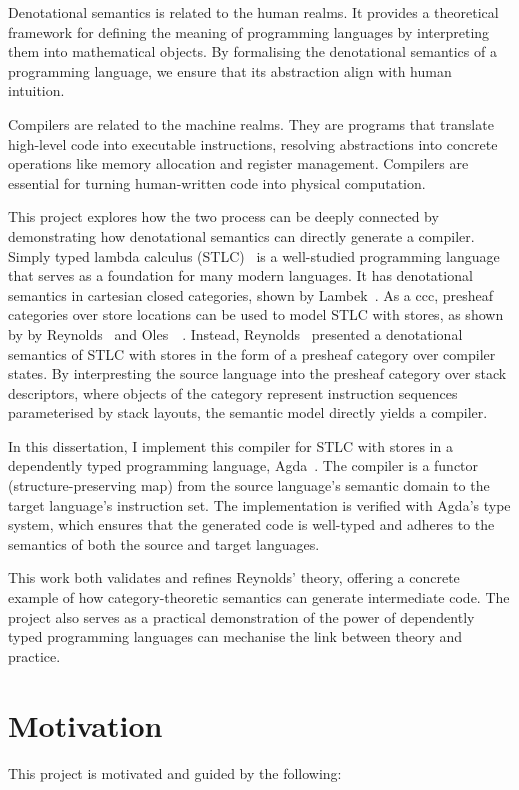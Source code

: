 \documentclass[12pt,twoside,a4paper]{report}
\theoremstyle{definition}
\theoremstyle{definition}
\theoremstyle{definition}
\theoremstyle{definition}
\newcounter{motivation}
\begin{document}
    Denotational semantics is related to the human realms. It provides a theoretical framework for defining the meaning of programming languages by interpreting them into mathematical objects. By formalising the denotational semantics of a programming language, we ensure that its abstraction align with human intuition. 

    Compilers are related to the machine realms. They are programs that translate high-level code into executable instructions, resolving abstractions into concrete operations like memory allocation and register management. Compilers are essential for turning human-written code into physical computation.

    This project explores how the two process can be deeply connected by demonstrating how denotational semantics can directly generate a compiler. Simply typed lambda calculus (STLC)~\cite{stlc} is a well-studied programming language that serves as a foundation for many modern languages. It has denotational semantics in cartesian closed categories, shown by Lambek~\cite{lambek}. As a ccc, presheaf categories over store locations can be used to model STLC with stores, as shown by by Reynolds~\cite{essence} and Oles~\cite{Oles_1}~\cite{Oles_2}. Instead, Reynolds~\cite{Reynolds} presented a denotational semantics of STLC with stores in the form of a presheaf category over compiler states. By interpresting the source language into the presheaf category over stack descriptors, where objects of the category represent instruction sequences parameterised by stack layouts, the semantic model directly yields a compiler. 
    
    In this dissertation, I implement this compiler for STLC with stores in a dependently typed programming language, Agda~\cite{Agda}. The compiler is a functor (structure-preserving map) from the source language's semantic domain to the target language's instruction set. The implementation is verified with Agda's type system, which ensures that the generated code is well-typed and adheres to the semantics of both the source and target languages.

    This work both validates and refines Reynolds' theory, offering a concrete example of how category-theoretic semantics can generate intermediate code. The project also serves as a practical demonstration of the power of dependently typed programming languages can mechanise the link between theory and practice.

    \section{Motivation} \label{sec: motivation}
        This project is motivated and guided by the following:
\end{document}

